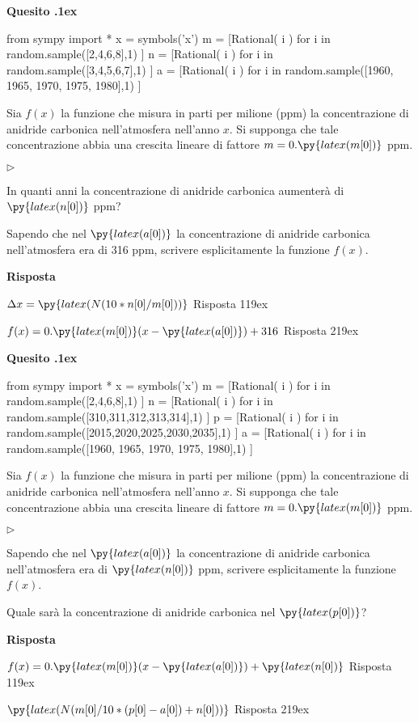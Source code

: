 \documentclass[11pt,twoside,a4paper]{article}
\newcommand{\mylabel}[1]{#1\hfill}
\renewenvironment{itemize}
  {\begin{list}{$\triangleright$}{%
   \setlength{\parskip}{0mm}
   \setlength{\topsep}{.4\baselineskip}
   \setlength{\rightmargin}{0mm}
   \setlength{\listparindent}{0mm}
   \setlength{\itemindent}{0mm}
   \setlength{\labelwidth}{2ex}
   \setlength{\itemsep}{.4\baselineskip}
   \setlength{\parsep}{0mm}
   \setlength{\partopsep}{0mm}
   \setlength{\labelsep}{1ex}
   \setlength{\leftmargin}{\labelwidth+\labelsep}
   \let\makelabel\mylabel}}{%
   \end{list}\vspace*{-1.3mm}}
\newcounter{quesito}
\newenvironment{question}{\bigskip\addtocounter{quesito}{1}\bigskip\bigskip\par\textbf{Quesito \thequesito.\kern1ex}}{\vspace{\parskip}}
\newenvironment{answer}{\par\textbf{Risposta\quad}}{\vspace{\parskip}}
\begin{document}
\begin{question}
\begin{pycode}
from sympy import *
x = symbols('x')
m = [Rational( i ) for i in random.sample([2,4,6,8],1) ]
n = [Rational( i ) for i in random.sample([3,4,5,6,7],1) ]
a = [Rational( i ) for i in random.sample([1960, 1965, 1970, 1975, 1980],1) ]
\end{pycode}
Sia $f(x)$ la funzione che misura in parti per milione (ppm) la concentrazione di anidride carbonica nell'atmosfera nell'anno $x$. Si supponga che tale concentrazione abbia una crescita lineare di fattore $m = 0.\py{latex(m[0])}$ ppm.
\begin{itemize}
\item[1.] In quanti anni la concentrazione di anidride carbonica aumenter\`a di $\py{latex(n[0])}$ ppm?
\item[2.] Sapendo che nel $\py{latex(a[0])}$ la concentrazione di anidride carbonica nell'atmosfera era di 316 ppm, scrivere esplicitamente la funzione $f(x)$.
\end{itemize}
\begin{answer}

{\color{blue}
$\Delta x = \py{latex(N(10*n[0]/m[0]))}$
\hfill Risposta 1\kern19ex}

\smallskip
{\color{blue}
$f(x) = 0.\py{latex(m[0])} ( x - \py{latex(a[0])}) + 316$
\hfill Risposta 2\kern19ex}

\end{answer}
\end{question}
\begin{question}
\begin{pycode}
from sympy import *
x = symbols('x')
m = [Rational( i ) for i in random.sample([2,4,6,8],1) ]
n = [Rational( i ) for i in random.sample([310,311,312,313,314],1) ]
p = [Rational( i ) for i in random.sample([2015,2020,2025,2030,2035],1) ]
a = [Rational( i ) for i in random.sample([1960, 1965, 1970, 1975, 1980],1) ]
\end{pycode}
Sia $f(x)$ la funzione che misura in parti per milione (ppm) la concentrazione di anidride carbonica nell'atmosfera nell'anno $x$. Si supponga che tale concentrazione abbia una crescita lineare di fattore $m = 0.\py{latex(m[0])}$ ppm.
\begin{itemize}
\item[1.] Sapendo che nel $\py{latex(a[0])}$ la concentrazione di anidride carbonica nell'atmosfera era di $\py{latex(n[0])}$ ppm, scrivere esplicitamente la funzione $f(x)$.
\item[2.] Quale sar\`a la concentrazione di anidride carbonica nel $\py{latex(p[0])}$?
\end{itemize}
\begin{answer}

\smallskip
{\color{blue}
$f(x) = 0.\py{latex(m[0])} ( x - \py{latex(a[0])}) + \py{latex(n[0])}$
\hfill Risposta 1\kern19ex}

{\color{blue}
$\py{latex(N(m[0]/10*(p[0]-a[0])+n[0]))}$
\hfill Risposta 2\kern19ex}

\end{answer}
\end{question}
\end{document}
